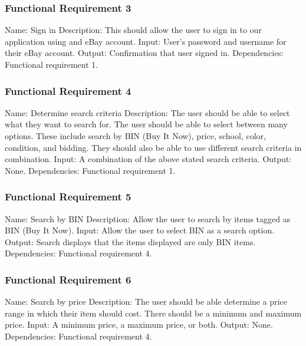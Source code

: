 \documentclass[journal,compsoc, 10pt, draftclsnofoot, onecolumn]{IEEEtran}
\begin{document}
\subsubsection{Functional Requirement 3}
Name: Sign in\newline
Description: This should allow the user to sign in to our application using and 
eBay account.\newline
Input: User's password and username for their eBay account.\newline
Output: Confirmation that user signed in.\newline
Dependencies: Functional requirement 1.

\subsubsection{Functional Requirement 4}
Name: Determine search criteria\newline
Description: The user should be able to select what they want to search for. The
 user should be able to select between many options. These include search by BIN
 (Buy It Now), price, school, color, condition, and bidding. They should also be
 able to use different search criteria in combination.\newline
Input: A combination of the above stated search criteria.\newline
Output: None.\newline
Dependencies: Functional requirement 1.

\subsubsection{Functional Requirement 5}
Name: Search by BIN\newline
Description: Allow the user to search by items tagged as BIN (Buy It Now).
\newline
Input: Allow the user to select BIN as a search option.\newline
Output: Search displays that the items displayed are only BIN items.\newline
Dependencies: Functional requirement 4.

\subsubsection{Functional Requirement 6}
Name: Search by price\newline
Description: The user should be able determine a price range in which their 
item should cost. There should be a minimum and maximum price. \newline
Input: A minimum price, a maximum price, or both.\newline
Output: None.\newline
Dependencies: Functional requirement 4.
\end{document}
